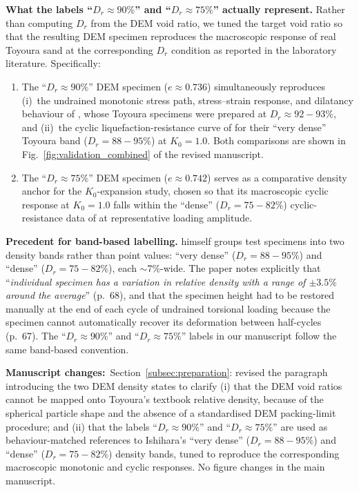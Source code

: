\documentclass[11pt,a4paper]{article}
\newcommand{\changed}[1]{\par\noindent\textbf{Manuscript changes:}\ #1\par}
\begin{document}
\medskip
\noindent\textbf{What the labels ``$D_r \approx 90\%$'' and
``$D_r \approx 75\%$'' actually represent.}
Rather than computing $D_r$ from the DEM void ratio, we tuned the
target void ratio so that the resulting DEM specimen reproduces the
macroscopic response of real Toyoura sand at the corresponding
$D_r$ condition as reported in the laboratory literature.
Specifically:
\begin{enumerate}[leftmargin=*,label=(\alph*),topsep=2pt,itemsep=3pt]
  \item The ``$D_r \approx 90\%$'' DEM specimen ($e \approx 0.736$)
    simultaneously reproduces (i)~the undrained monotonic stress
    path, stress--strain response, and dilatancy behaviour of
    \citet{Nakata1998}, whose Toyoura specimens were prepared at
    $D_r \approx 92\!-\!93\%$, and (ii)~the cyclic
    liquefaction-resistance curve of \citet{Ishihara1985} for their
    ``very dense'' Toyoura band ($D_r = 88\!-\!95\%$) at
    $K_0 = 1.0$. Both comparisons are shown in
    Fig.~\ref{fig:validation_combined} of the revised manuscript.
  \item The ``$D_r \approx 75\%$'' DEM specimen ($e \approx 0.742$)
    serves as a comparative density anchor for the $K_0$-expansion
    study, chosen so that its macroscopic cyclic response at
    $K_0 = 1.0$ falls within the ``dense'' ($D_r = 75\!-\!82\%$)
    cyclic-resistance data of \citet{Ishihara1985} at representative
    loading amplitude.
\end{enumerate}

\medskip
\noindent\textbf{Precedent for band-based labelling.}
\citet{Ishihara1985} himself groups test specimens into two
density bands rather than point values: ``very dense''
($D_r = 88\!-\!95\%$) and ``dense'' ($D_r = 75\!-\!82\%$), each
$\sim$7\%-wide. The paper notes explicitly that
``\emph{individual specimen has a variation in relative density
with a range of $\pm 3.5\%$ around the average}'' (p.~68), and that
the specimen height had to be restored manually at the end of each
cycle of undrained torsional loading because the specimen cannot
automatically recover its deformation between half-cycles (p.~67).
The ``$D_r \approx 90\%$'' and ``$D_r \approx 75\%$'' labels in our
manuscript follow the same band-based convention.

\changed{Section~\ref{subsec:preparation}: revised the paragraph
introducing the two DEM density states to clarify (i) that the DEM
void ratios cannot be mapped onto Toyoura's textbook relative
density, because of the spherical particle shape and the absence of
a standardised DEM packing-limit procedure; and (ii) that the
labels ``$D_r \approx 90\%$'' and ``$D_r \approx 75\%$'' are used
as behaviour-matched references to Ishihara's ``very dense''
($D_r = 88\!-\!95\%$) and ``dense'' ($D_r = 75\!-\!82\%$) density
bands, tuned to reproduce the corresponding macroscopic monotonic
and cyclic responses. No figure changes in the main manuscript.}
\end{document}
